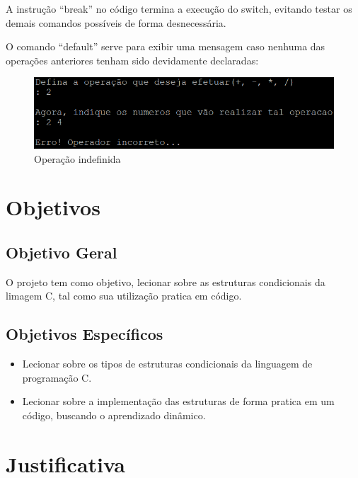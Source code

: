 \documentclass[a4paper,10pt]{article}  %
\begin{document}
     A instrução “break” no código termina a execução do switch, evitando testar os demais comandos possíveis de forma desnecessária. \par
   
     O comando “default” serve para exibir uma mensagem caso nenhuma das operações anteriores tenham sido devidamente declaradas:


 \begin{figure}[H]
 \centering
 \includegraphics[width=.80\linewidth]{imagens/ex7.png}
 \caption{Operação indefinida}
\end{figure}


\section{Objetivos}

 \subsection{Objetivo Geral}

   O projeto tem como objetivo, lecionar sobre as estruturas condicionais da limagem C, tal como sua utilização pratica em código. 

 \subsection{Objetivos Específicos}

\begin{itemize}
 \item Lecionar sobre os tipos de estruturas condicionais da linguagem de programação C.
 \item Lecionar sobre a implementação das estruturas de forma pratica em um código, buscando o aprendizado dinâmico.  
\end{itemize}


\section{Justificativa}
\end{document}
